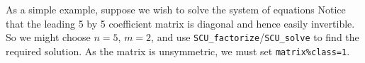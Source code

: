 \documentclass{galahad}
\newcommand{\packagename}{SCU}
\begin{document}
\galexample
As a simple example, suppose we wish to solve the system of 
equations 
Notice that the leading 5 by 5 coefficient matrix is diagonal and 
hence easily invertible. So we might choose $n = 5$, $m = 2$, 
and use {\tt \packagename\_factorize}/{\tt \packagename\_solve} to find the required 
solution. As the matrix is unsymmetric, we must set {\tt matrix\%class=1}.
\end{document}
